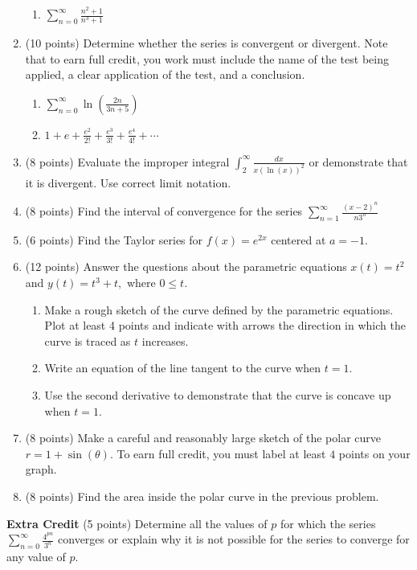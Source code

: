\documentclass[12pt]{article}
\let\ds\displaystyle
\begin{document}
\begin{enumerate}
\begin{enumerate}
	\item $\ds \sum_{n=0}^\infty \frac{n^2+1}{n^3+1}$
	\vfill
		\end{enumerate}
\newpage
\item (10 points) Determine whether the series is convergent or divergent. Note that to earn full credit, you work must include the name of the test being applied, a clear application of the test, and a conclusion. 
	\begin{enumerate}
	\item $\ds \sum_{n=0}^\infty \ln \left( \frac{2n}{3n+5}\right)$
	\vfill
	\item $\ds 1+e+\frac{e^2}{2!}+\frac{e^3}{3!}+\frac{e^4}{4!}+\cdots$
	\vfill
	\end{enumerate}
\newpage
\item (8 points) Evaluate the improper integral $\ds \int_2^\infty \frac{dx}{x (\ln(x))^2}$ or demonstrate that it is divergent. Use correct limit notation.
\vfill
\item (8 points) Find the interval of convergence for the series $\ds \sum_{n=1}^\infty \frac{(x-2)^n}{n3^n}$
\vfill
\vfill
\newpage
\item (6 points) Find the Taylor series for $f(x)=e^{2x}$ centered at $a=-1.$
\vfill
\newpage
\item (12 points) Answer the questions about the parametric equations $x(t)=t^2$ and $y(t)=t^3+t,$ where $0 \leq t.$
	\begin{enumerate}
	\item Make a rough sketch of the curve defined by the parametric equations. Plot at least 4 points and indicate with arrows the direction in which the curve is traced as $t$ increases.\\
	
\vfill

	\item Write an equation of the line tangent to the curve when $t=1.$
	\vfill
	\item Use the second derivative to demonstrate that the curve is concave up when $t=1.$
	\vfill
	\end{enumerate}
\newpage	
\item (8 points) Make a careful and reasonably large sketch of the polar curve $r=1+\sin(\theta).$ To earn full credit, you must label at least $4$ points on your graph.
\vfill
\item (8 points) Find the area inside the polar curve in the previous problem.
\vfill
\end{enumerate}
\newpage
\textbf{Extra Credit} (5 points) Determine all the values of $p$ for which the series $\ds \sum_{n=0}^\infty \frac{4^{pn}}{3^n}$ converges or explain why it is not possible for the series to converge for any value of $p.$
\end{document}
